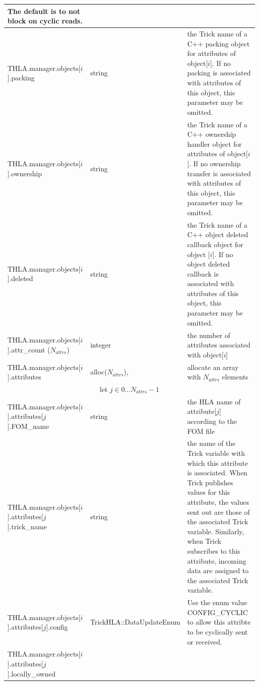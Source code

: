 \begin{table}[h]
\begin{center}
\begin{tabular}{|p{2in}|l|p{3.25in}|}
    The default is to not block on cyclic reads.
    \\
    \hline
    {\ttfamily THLA.manager.objects[$i$].\-packing}
    & string
    & the Trick name of a C++ packing object for attributes of object[$i$].
      If no packing is associated with attributes of this object,
      this parameter may be omitted.
    \\
    \hline
    {\ttfamily THLA.manager.objects[$i$].\-ownership}
    & string
    & the Trick name of a C++ ownership handler object for attributes of object[$i$].
      If no ownership transfer is associated with attributes of this object,
      this parameter may be omitted.
    \\
    \hline
    {\ttfamily THLA.manager.objects[$i$].\-deleted}
    & string
    & the Trick name of a C++ object deleted callback object for object [$i$].
      If no object deleted callback is associated with attributes of this object,
      this parameter may be omitted.
    \\
    \hline
    {\ttfamily THLA.manager.objects[$i$].\-attr\_count}
    ($N_{attrs}$)
    & integer
    & the number of attributes associated with object[$i$]
    \\
    \hline
    {\ttfamily THLA.manager.objects[$i$].\-attributes}
    & alloc($N_{attrs}$),
    & allocate an array with $N_{attrs}$ elements
    \\
    \hline
    \hline
    \multicolumn{3}{|c|}{
      \rule[-3mm]{0mm}{7mm}
      let $j \in 0...N_{attrs}-1$
    }
    \\
    \hline
    {\ttfamily THLA.manager.objects[$i$].\-attributes[$j$].FOM\_name}
    & string
    & the HLA name of attribute[$j$] according to the FOM file
    \\
    \hline
    {\ttfamily THLA.manager.objects[$i$].\-attributes[$j$].trick\_name}
    & string
    & the name of the Trick variable with which this attribute is associated.
      When Trick publishes values for this attribute, the values sent out
      are those of the associated Trick variable.
      Similarly,
      when Trick subscribes to this attribute, incoming data are assigned to
      the associated Trick variable.
    \\
    \hline
    {\ttfamily THLA.manager.objects[$i$].\-attributes[$j$].config}
    & {\ttfamily TrickHLA::DataUpdateEnum}
    & Use the enum value {\ttfamily CONFIG\_CYCLIC} to allow this attribte
      to be cyclically sent or received.
    \\
    \hline
    {\ttfamily THLA.manager.objects[$i$].\-attributes[$j$].locally\_owned}

\end{tabular}
\end{center}
\end{table}
